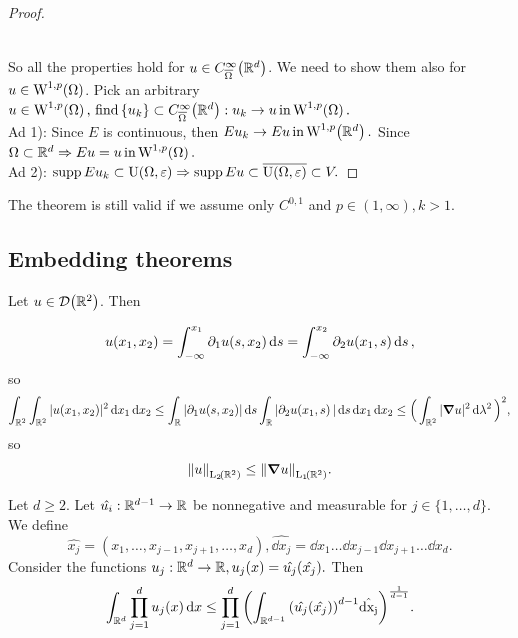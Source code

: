 \documentclass{article}
\begin{document}
\begin{proof}
\begin{itemize}
\begin{align*}
			\end{align*}
	\end{itemize}
	So all the properties hold for $u \in C^{\infty}_{\overline{\Omega}}\qty({\mathbb R}^d)$. We need to show them also for $u \in \WkpSet[1][p]{\Omega}$. Pick an arbitrary $u \in \WkpSet[1][p]{\Omega}, \, \text{find} \, \{u_k\} \subset C^{\infty}_{\overline{\Omega}}\qty(\R^d): u_k \to u \, \text{in} \, \WkpSet[1][p]{\Omega}.$ \\
	Ad 1): Since $E$ is continuous, then $E u_k \to Eu \, \text{in} \, \WkpSet[1][p]{\R^d}.$ Since $\Omega \subset \R^d \Rightarrow Eu=u \, \text{in} \, \WkpSet[1][p]{\Omega}.$ \\
	Ad 2): $\operatorname{supp} Eu_k \subset \text{U}(\Omega,\varepsilon) \Rightarrow \operatorname{supp} Eu \subset \overline{\text{U}(\Omega,\varepsilon)} \subset V.$

\end{proof}

\begin{remark}
	The theorem is still valid if we assume only $C^{0,1}$ and $p \in (1,\infty), k>1.$
\end{remark}

\subsection{Embedding theorems}
\label{sec:embedding}

\begin{example}
	Let $u \in \mathcal{D}\qty({\mathbb R}^2)$. Then 

	\begin{equation*}
		u\qty(x_1,x_2) = \int_{-\infty}^{x_1} \partial_{1}u\qty(s,x_2)\dd{s} = \int_{-\infty}^{x_2} \partial_{2}u(x_1,s)\dd{s},
	\end{equation*}
	so 
	\begin{equation*}
		\int_{{\mathbb R}^2}\int_{{\mathbb R}^2}|u(x_1,x_2)|^{2}\dd{x_1} \dd{x_2} \leq \int_{{\mathbb R}}|\partial_{1}u(s,x_2)|\dd{s} \int_{{\mathbb R}}|\partial_{2}u\qty(x_1,s)|\dd{s} \dd{x_1} \dd{x_2} \leq \Big(\int_{{\mathbb R}^2}|\grad u|^{2}\dd{\lambda^{2}}\Big)^{2},
	\end{equation*}
	so
	\[
		\norm{u}_{\LpSet[2]{\R^2}} \leq \norm{\grad u}_{\LpSet[1]{\R^2}}.
	\]
\end{example}

\begin{lemma}
	Let $d\geq 2$. Let $\hat{u_i}:{\mathbb R}^{d-1} \to {\mathbb R}$ be nonnegative and measurable for $j \in \{1,\dots,d\}.$ We define
	\[
		\hat{x_j} = (x_1, \dots, x_{j-1}, x_{j+1}, \dots, x_d), \hat{\dd{x_j}} = \dd{x_1} \dots \dd{x_{j-1}} \dd{x_{j+1}} \dots \dd{x_d}.
	\]
	Consider the functions $u_j:{\mathbb R}^d \to {\mathbb R}, u_j\qty(x)=\hat{u_j}(\hat{x_j}).$ Then
	\begin{equation}
		\int_{{\mathbb R}^d}\prod_{j=1}^d u_j\qty(x)\dd{x} \leq \prod_{j=1}^d \qty(\int_{{\mathbb R}^{d-1}}\qty(\hat{u_j}\qty(\hat{x_j}))^{d-1}\hat{\dd{x_j}})^{\frac{1}{d-1}}.
	\end{equation}
\end{lemma}
\end{document}
